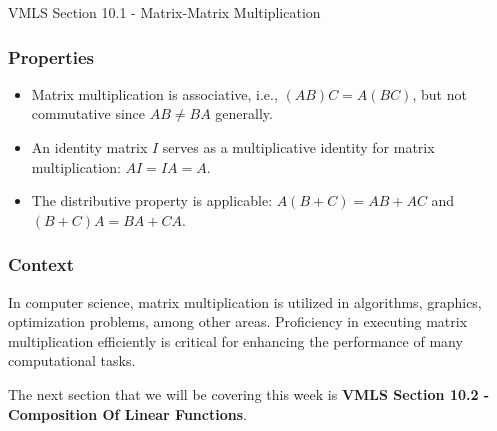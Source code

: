 \begin{notes}{VMLS Section 10.1 - Matrix-Matrix Multiplication}
    \subsubsection*{Properties}
    \begin{itemize}
        \item Matrix multiplication is associative, i.e., $(AB)C = A(BC)$, but not commutative since $AB \neq BA$ generally.
        \item An identity matrix $I$ serves as a multiplicative identity for matrix multiplication: $AI = IA = A$.
        \item The distributive property is applicable: $A(B + C) = AB + AC$ and $(B + C)A = BA + CA$.
    \end{itemize}
    
    \subsubsection*{Context}
    In computer science, matrix multiplication is utilized in algorithms, graphics, optimization problems, among other areas. Proficiency in executing matrix multiplication efficiently is critical for 
    enhancing the performance of many computational tasks.
\end{notes}

The next section that we will be covering this week is \textbf{VMLS Section 10.2 - Composition Of Linear Functions}.


